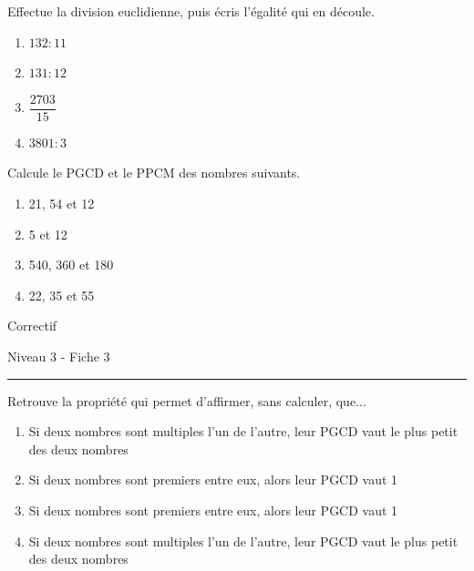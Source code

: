 \documentclass[12pt,parskip=half-, twoside=semi]{scrartcl}
\begin{document}
\begin{exercise}
  Effectue la division euclidienne, puis écris l'égalité qui en découle. 
    \begin{enumerate}[cols=2]
      \item \(132 : 11\)
      \item \(131 : 12\)
      \item \(\dfrac{2703}{15}\)
      \item \(3801 : 3\)
    \end{enumerate}
\end{exercise}

\begin{exercise}
  Calcule le PGCD et le PPCM des nombres suivants. 
    \begin{enumerate}[cols=2]
      \item 21, 54 et 12
      \item 5 et 12
      \item 540, 360 et 180
      \item 22, 35 et 55
    \end{enumerate}
\end{exercise}

\newpage

\begin{center}
  \bfseries
  \begin{Huge}
    Correctif
  \end{Huge}
  \smallbreak
  \begin{large}
    Niveau 3    - Fiche 3
  \end{large}
  \smallbreak
  \rule[10pt]{.5\linewidth}{1 pt}
\end{center}

\setcounter{exercise}{0}
      
\begin{exercise}
  Retrouve la propriété qui permet d'affirmer, sans calculer, que... 
  \begin{enumerate}
    \item Si deux nombres sont multiples l'un de l'autre, leur PGCD vaut le plus petit des deux nombres
    \item Si deux nombres sont premiers entre eux, alors leur PGCD vaut 1
    \item Si deux nombres sont premiers entre eux, alors leur PGCD vaut 1
    \item Si deux nombres sont multiples l'un de l'autre, leur PGCD vaut le plus petit des deux nombres
  \end{enumerate}
\end{exercise}
\end{document}
